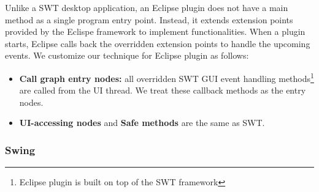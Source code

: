 Unlike a SWT desktop application, an Eclipse plugin does not
have a main method as a single program entry point. Instead, it extends
extension points provided by the Eclispe framework to implement
functionalities. When a plugin starts, Eclipse
calls back the overridden extension points to handle the
upcoming events. We customize our technique for Eclipse plugin as follows:


\begin{itemize}

\item \textbf{Call graph entry nodes: } all overridden SWT
GUI event handling methods\footnote{Eclipse plugin is built
on top of the SWT framework} are called from the UI thread.
We treat these callback methods as the entry nodes.



\item \textbf{UI-accessing nodes} and \textbf{Safe methods} are the same as SWT.

\end{itemize}

\subsubsection{Swing}


